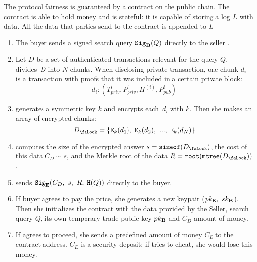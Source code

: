 The protocol fairness is guaranteed by a contract on the public chain. The contract is able to hold money and is stateful: it is capable of storing a log $L$ with data. All the data that parties send to the contract is appended to $L$.
\begin{enumerate}
\item The buyer  sends a signed search query $\mathtt{Sig}_{\mathbf{B}}(Q)$ directly to the seller .
\item Let $D$ be a set of authenticated transactions relevant for the query $Q$.  divides~$D$ into $N$ chunks. When disclosing private transaction, one chunk $d_i$ is a transaction with proofs that it was included in a certain private block:
\begin{equation}
d_i: (T_{priv}^i, P_{priv}^i, H^{(i)}, P_{pub}^i)
\end{equation}

\item {} generates a symmetric key $k$ and encrypts each~$d_i$ with $k$. Then she makes an array of encrypted chunks:
\begin{equation}
\Lock{D} = \{ \Encrypt_\Key{k}(d_1),\ \Encrypt_\Key{k}(d_2),\ ...,\ \Encrypt_\Key{k}(d_N) \}
\end{equation}

\item {} computes the size of the encrypted answer $s = \SizeOf(\Lock{D})$, the cost of this data $C_D \sim s$, and the Merkle root of the data $R = \Root(\MerkleTree(\Lock{D}))$.

\item {} sends $\Sign_\Party{E}(C_D,\ s,\ R,\ \Hash(Q))$ directly to the buyer.

\item If buyer agrees to pay the price, she generates a new keypair ($pk_{\mathbf{B}},\ sk_{\mathbf{B}}$). Then she initializes the contract with the data provided by the Seller, search query $Q$, its own temporary trade public key $pk_{\mathbf{B}}$ and $C_D$ amount of money.

\item \label{step:seller-deposits-money} If  agrees to proceed, she sends a predefined amount of money $C_E$ to the contract address. $C_E$ is a security deposit: if  tries to cheat, she would lose this money.


\end{enumerate}
